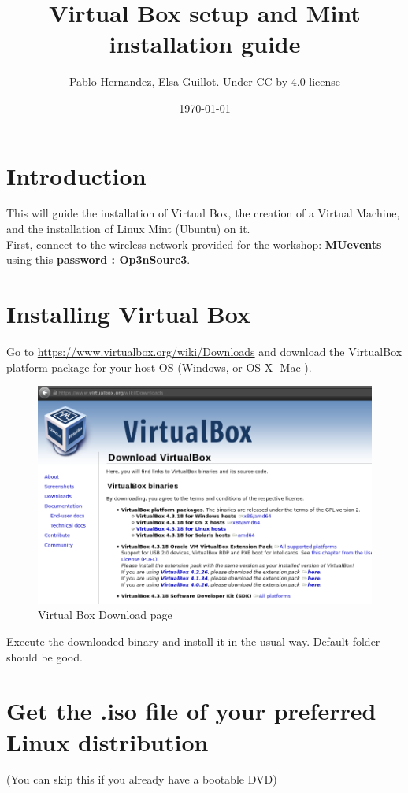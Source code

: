 \documentclass[a4paper]{article}
\title{ Virtual Box setup and Mint installation guide}
\author{Pablo Hernandez, Elsa Guillot. Under CC-by 4.0 license}
\date{\today}
\begin{document}
\maketitle


\section{Introduction}
This will guide the installation of Virtual Box, the creation of a Virtual Machine, and the installation of Linux Mint (Ubuntu) on it.\\

\noindent First, connect to the wireless network provided for the workshop: \textbf{MUevents} using this \textbf{password : Op3nSourc3}.
\section{Installing Virtual Box}
\label{sec:vb}
Go to \url{https://www.virtualbox.org/wiki/Downloads} and download the VirtualBox platform package for your host OS (Windows, or OS X -Mac-). 
\begin{figure}[H]
    \centering
    \includegraphics[width=0.5\linewidth]{./VBDownload.png}
    \caption{Virtual Box Download page}
    \label{fig:VMDownload}
\end{figure}

Execute the downloaded binary and install it in the usual way. Default folder should be good.
\section{Get the .iso file of your preferred Linux distribution}
\label{sec:iso}
(You can skip this if you already have a bootable DVD)\\
\end{document}
